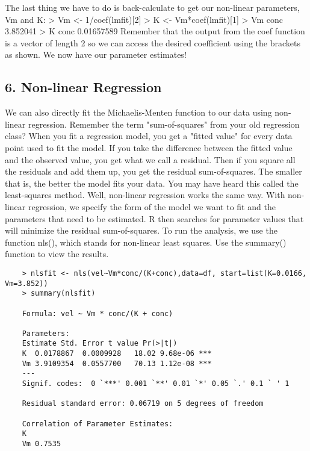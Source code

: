 The last thing we have to do is back-calculate to get our non-linear parameters, Vm and K: 
> Vm <- 1/coef(lmfit)[2]
> K <- Vm*coef(lmfit)[1]
> Vm
conc 
3.852041 
> K
conc 
0.01657589 
Remember that the output from the coef function is a vector of length 2 so we can access the desired coefficient using the brackets as shown. We now have our parameter estimates! 

\subsection{6. Non-linear Regression}


We can also directly fit the Michaelis-Menten function to our data using non-linear regression. Remember the term "sum-of-squares" from your old regression class? When you fit a regression model, you get a "fitted value" for every data point used to fit the model. If you take the difference between the fitted value and the observed value, you get what we call a residual. Then if you square all the residuals and add them up, you get the residual sum-of-squares. The smaller that is, the better the model fits your data. You may have heard this called the least-squares method. Well, non-linear regression works the same way. With non-linear regression, we specify the form of the model we want to fit and the parameters that need to be estimated. R then searches for parameter values that will minimize the residual sum-of-squares. 
To run the analysis, we use the function nls(), which stands for non-linear least squares. Use the summary() function to view the results. 
\begin{framed}
	\begin{verbatim}
	> nlsfit <- nls(vel~Vm*conc/(K+conc),data=df, start=list(K=0.0166, Vm=3.852))
	> summary(nlsfit)
	
	Formula: vel ~ Vm * conc/(K + conc)
	
	Parameters:
	Estimate Std. Error t value Pr(>|t|)    
	K  0.0178867  0.0009928   18.02 9.68e-06 ***
	Vm 3.9109354  0.0557700   70.13 1.12e-08 ***
	---
	Signif. codes:  0 `***' 0.001 `**' 0.01 `*' 0.05 `.' 0.1 ` ' 1 
	
	Residual standard error: 0.06719 on 5 degrees of freedom
	
	Correlation of Parameter Estimates:
	K
	Vm 0.7535 
	\end{verbatim}
\end{framed}

